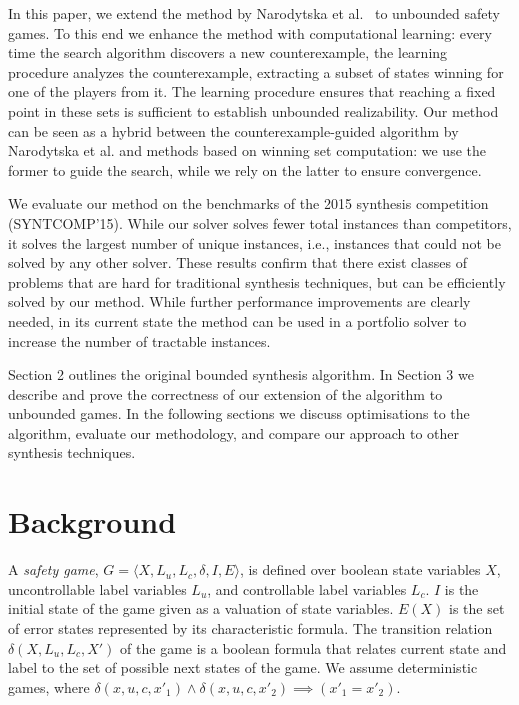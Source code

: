 \documentclass{llncs}
\begin{document}

In this paper, we extend the method by Narodytska et al.~\cite{narodytska2014} to unbounded 
safety games.  To this end we enhance the method with computational learning: every time
the search algorithm discovers a new counterexample, the learning procedure analyzes the 
counterexample, extracting a subset of states winning for one of the players from it.  
The learning procedure ensures that reaching a fixed point in these sets is sufficient to establish 
unbounded realizability.
Our method can be seen as a hybrid between the counterexample-guided algorithm by
Narodytska et al. and methods based on winning set computation: we use the former to guide 
the search, while we rely on the latter to ensure convergence.

We evaluate our method on the benchmarks of the 2015 synthesis competition
(SYNTCOMP'15).  While our solver solves fewer total instances than competitors,
it solves the largest number of unique instances, i.e., instances that could not be solved by 
any other solver.  These results confirm that there exist classes of problems that are
hard for traditional synthesis techniques, but can be efficiently solved by our method.
While further performance improvements are clearly needed, in its current state the method 
can be used in a portfolio solver to increase the number of tractable instances.

Section 2 outlines the original bounded synthesis algorithm. In Section 3 we
describe and prove the correctness of our extension of the algorithm to
unbounded games. In the following sections we discuss optimisations to the
algorithm, evaluate our methodology, and compare our approach to other
synthesis techniques.

\section{Background}

A \emph{safety game}, $G = \langle X, L_u, L_c, \delta, I, E \rangle$,
is defined over boolean state variables $X$, uncontrollable label variables $L_u$, and
controllable label variables $L_c$.  $I$ is the initial state of the game given as a 
valuation of state variables.  $E(X)$ is the set of error states represented by its 
characteristic formula.  The transition relation $\delta(X, L_u, L_c, X')$ of the game 
is a boolean formula that relates current state and label to the set of possible next 
states of the game.  We assume deterministic games, where 
$\delta(x,u,c,x'_1) \land \delta(x,u,c,x'_2) \implies (x'_1=x'_2)$.
\end{document}
